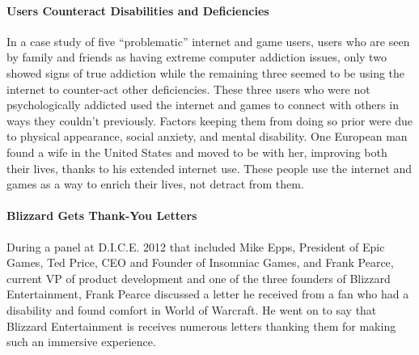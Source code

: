 \documentclass[11pt]{article}
\begin{document}
\begin{multicols}{2}
\paragraph{Users Counteract Disabilities and Deficiencies\\}
In a case study of five ``problematic'' internet and game users, users who are seen by family and friends as having extreme computer addiction issues, only two showed signs of true addiction while the remaining three seemed to be using the internet to counter-act other deficiencies. \cite{IsThereEvidenceOfInternetAddiction} These three users who were not psychologically addicted used the internet and games to connect with others in ways they couldn't previously. Factors keeping them from doing so prior were due to physical appearance, social anxiety, and mental disability. One European man found a wife in the United States and moved to be with her, improving both their lives, thanks to his extended internet use. \cite{IsThereEvidenceOfInternetAddiction} These people use the internet and games as a way to enrich their lives, not detract from them.

\paragraph{Blizzard Gets Thank-You Letters\\}
During a panel at D.I.C.E. 2012 \cite{DICEInterview} that included Mike Epps, President of Epic Games, Ted Price, CEO and Founder of Insomniac Games, and Frank Pearce, current VP of product development and one of the three founders of Blizzard Entertainment, Frank Pearce discussed a letter he received from a fan who had a disability and found comfort in World of Warcraft. \cite{DICEInterview} He went on to say that Blizzard Entertainment is receives numerous letters thanking them for making such an immersive experience. \cite{DICEInterview}


\end{multicols}
\end{document}
